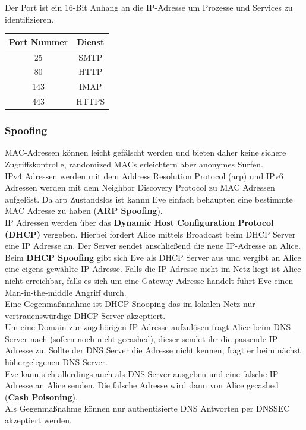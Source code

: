 \documentclass[a4paper,12pt,leqno]{article}
\begin{document}
Der Port ist ein 16-Bit Anhang an die IP-Adresse um Prozesse und Services zu identifizieren.\\

\begin{tabular}{|c|c|}
\hline
Port Nummer & Dienst\\
\hline
25 & SMTP\\
80 & HTTP\\
143 & IMAP\\
443 & HTTPS\\
\hline
\end{tabular}

\subsubsection{Spoofing}

\label{txt:spoofing}
MAC-Adressen können leicht gefälscht werden und bieten daher keine sichere Zugriffskontrolle, randomized MACs erleichtern aber anonymes Surfen.\\
IPv4 Adressen werden mit dem Address Resolution Protocol (arp) und IPv6 Adressen werden mit dem Neighbor Discovery Protocol zu MAC Adressen aufgelöst. Da arp Zustandslos ist kannn Eve einfach behaupten eine bestimmte MAC Adresse zu haben (\textbf{ARP Spoofing}).\\

IP Adressen werden über das \textbf{Dynamic Host Configuration Protocol (DHCP)} vergeben. Hierbei fordert Alice mittels Broadcast beim DHCP Server eine IP Adresse an. Der Server sendet anschließend die neue IP-Adresse an Alice.\\
Beim \textbf{DHCP Spoofing} gibt sich Eve als DHCP Server aus und vergibt an Alice eine eigens gewählte IP Adresse. Falls die IP Adresse nicht im Netz liegt ist Alice nicht erreichbar, falls es sich um eine Gateway Adresse handelt führt Eve einen Man-in-the-middle Angriff durch.\\
Eine Gegenmaßnnahme ist DHCP Snooping das im lokalen Netz nur vertrauenswürdige DHCP-Server akzeptiert.\\

Um eine Domain zur zugehörigen IP-Adresse aufzulösen fragt Alice beim DNS Server nach (sofern noch nicht gecashed), dieser sendet ihr die passende IP-Adresse zu. Sollte der DNS Server die Adresse nicht kennen, fragt er beim nächst höhergelegenen DNS Server.\\
Eve kann sich allerdings auch als DNS Server ausgeben und eine falsche IP Adresse an Alice senden.
Die falsche Adresse wird dann von Alice gecashed (\textbf{Cash Poisoning}).\\
Als Gegenmaßnahme können nur authentisierte DNS Antworten per DNSSEC akzeptiert werden.
\end{document}
